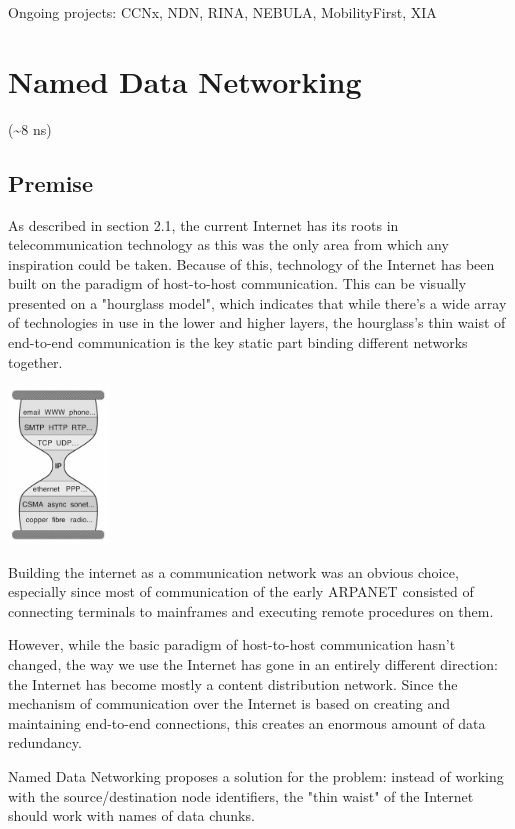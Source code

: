		Ongoing projects: CCNx, NDN, RINA, NEBULA, MobilityFirst, XIA

\chapter{Named Data Networking}
	(\textasciitilde8 ns)
	\section{Premise}
		As described in section 2.1, the current Internet has its roots in telecommunication technology as this was the only area from which any inspiration could be taken. Because of this, technology of the Internet has been built on the paradigm of host-to-host communication. This can be visually presented on a "hourglass model", which indicates that while there's a wide array of technologies in use in the lower and higher layers, the hourglass's thin waist of end-to-end communication is the key static part binding different networks together.

		\begin{center}\includegraphics[width=0.2\textwidth]{media/ndn_hourglass1.jpg}\end{center}

		Building the internet as a communication network was an obvious choice, especially since most of communication of the early ARPANET consisted of connecting terminals to mainframes and executing remote procedures on them.

		However, while the basic paradigm of host-to-host communication hasn't changed, the way we use the Internet has gone in an entirely different direction: the Internet has become mostly a content distribution network. Since the mechanism of communication over the Internet is based on creating and maintaining end-to-end connections, this creates an enormous amount of data redundancy.

		Named Data Networking proposes a solution for the problem: instead of working with the source/destination node identifiers, the "thin waist" of the Internet should work with names of data chunks.

